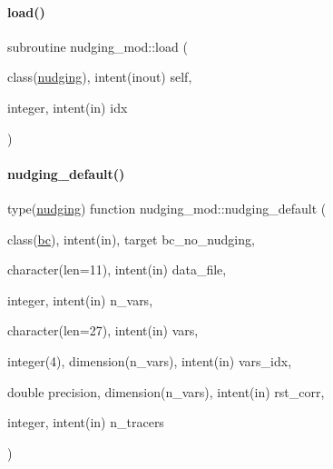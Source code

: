 \mbox{\label{namespacenudging__mod_a885c2883f43f1a6cf2aadd5765844aea}} 
\paragraph{\texorpdfstring{load()}{load()}}
{\footnotesize\ttfamily subroutine nudging\+\_\+mod\+::load (\begin{DoxyParamCaption}\item[{class(\mbox{\hyperlink{structnudging__mod_1_1nudging}{nudging}}), intent(inout)}]{self,  }\item[{integer, intent(in)}]{idx }\end{DoxyParamCaption})\hspace{0.3cm}{\ttfamily [private]}}

\mbox{\label{namespacenudging__mod_ab47a1ee2c4874bb8ed5ed05fc3d2fda1}} 
\paragraph{\texorpdfstring{nudging\+\_\+default()}{nudging\_default()}}
{\footnotesize\ttfamily type(\mbox{\hyperlink{structnudging__mod_1_1nudging}{nudging}}) function nudging\+\_\+mod\+::nudging\+\_\+default (\begin{DoxyParamCaption}\item[{class(\mbox{\hyperlink{structbc__mod_1_1bc}{bc}}), intent(in), target}]{bc\+\_\+no\+\_\+nudging,  }\item[{character(len=11), intent(in)}]{data\+\_\+file,  }\item[{integer, intent(in)}]{n\+\_\+vars,  }\item[{character(len=27), intent(in)}]{vars,  }\item[{integer(4), dimension(n\+\_\+vars), intent(in)}]{vars\+\_\+idx,  }\item[{double precision, dimension(n\+\_\+vars), intent(in)}]{rst\+\_\+corr,  }\item[{integer, intent(in)}]{n\+\_\+tracers }\end{DoxyParamCaption})}

\mbox{\label{namespacenudging__mod_a207796b926c6a79ec210afdad26ac817}} 
